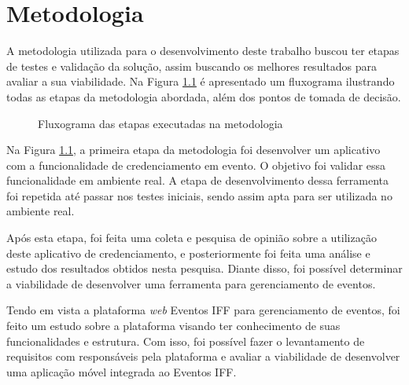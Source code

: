 \chapter{Metodologia}

A metodologia utilizada para o desenvolvimento deste trabalho buscou ter etapas de testes e validação da solução, assim buscando os melhores resultados para avaliar a sua viabilidade. Na Figura \ref{fig:metodologia} é apresentado um fluxograma ilustrando todas as etapas da metodologia abordada, além dos pontos de tomada de decisão. 

\begin{figure}[H]
    \centering
    \caption{Fluxograma das etapas executadas na metodologia}
    \label{fig:metodologia}
\end{figure}

Na Figura \ref{fig:metodologia}, a primeira etapa da metodologia foi desenvolver um aplicativo com a funcionalidade de credenciamento em evento. O objetivo foi validar essa funcionalidade em ambiente real. A etapa de desenvolvimento dessa ferramenta foi repetida até passar nos testes iniciais, sendo assim apta para ser utilizada no ambiente real.

Após esta etapa, foi feita uma coleta e pesquisa de opinião sobre a utilização deste aplicativo de credenciamento, e posteriormente foi feita uma análise e estudo dos resultados obtidos nesta pesquisa. Diante disso, foi possível determinar a viabilidade de desenvolver uma ferramenta para gerenciamento de eventos.

Tendo em vista a plataforma \textit{web} Eventos IFF para gerenciamento de eventos, foi feito um estudo sobre a plataforma visando ter conhecimento de suas funcionalidades e estrutura. Com isso, foi possível fazer o levantamento de requisitos com responsáveis pela plataforma e avaliar a viabilidade de desenvolver uma aplicação móvel integrada ao Eventos IFF.

